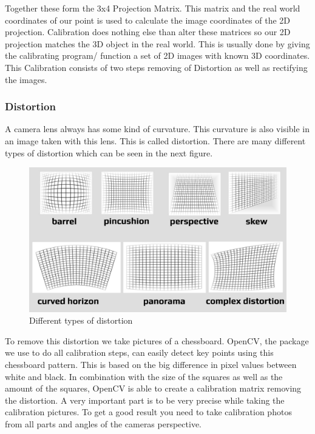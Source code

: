 \documentclass[journal,onecolumn]{IEEEtran}
\begin{document}
\noindent
Together these form the 3x4 Projection Matrix. This matrix and the real world coordinates of our point is used to calculate the image coordinates of the 2D projection. Calibration does nothing else than alter these matrices so our 2D projection matches the 3D object in the real world. This is usually done by giving the calibrating program/ function a set of 2D images with known 3D coordinates. 
This Calibration consists of two steps removing of Distortion as well as rectifying the images\cite{ImageRectification}. \newline
\subsubsection{Distortion}
\noindent
A camera lens always has some kind of curvature. This curvature is also visible in an image taken with this lens. This is called distortion. There are many different types of distortion which can be seen in the next figure.
\begin{figure}[H]
	\centering
	\includegraphics[scale=0.3]{distortion.jpg}
	\captionsetup{justification=centering}
	\caption{Different types of distortion}
\end{figure}
\noindent
To remove this distortion we take pictures of a chessboard. OpenCV, the package we use to do all calibration steps, can easily detect key points using this chessboard pattern. This is based on the big difference in pixel values between white and black. In combination with the size of the squares as well as the amount of the squares, OpenCV is able to create a calibration matrix removing the distortion.\newline
A very important part is to be very precise while taking the calibration pictures. To get a good result you need to take calibration photos from all parts and angles of the cameras perspective.\newline
\end{document}
